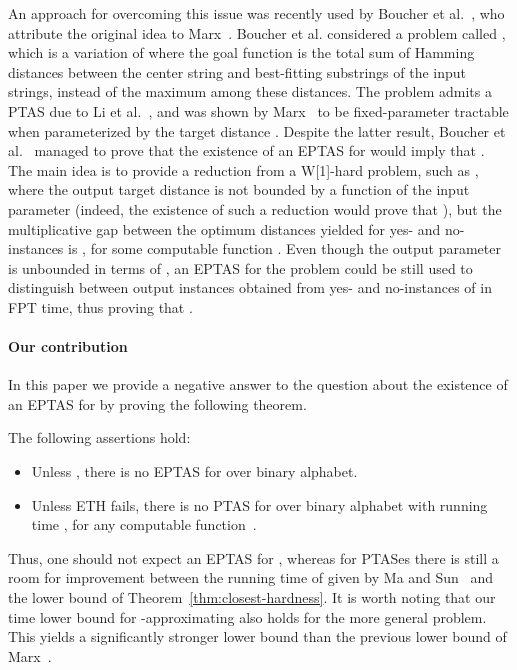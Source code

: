 An approach for overcoming this issue was recently used by Boucher et al.~\cite{Boucher15}, who attribute the original idea to Marx~\cite{Marx08-survey}. Boucher et al. considered a problem called \cPattern, which is a variation of \clSubstring where the goal function is the total sum of Hamming distances between the center string and best-fitting substrings of the input strings, instead of the maximum among these distances. The problem admits a PTAS due to Li et al.~\cite{LiMW02a}, and was shown by Marx~\cite{Marx08} to be fixed-parameter tractable when parameterized by the target distance . Despite the latter result, Boucher et al.~\cite{Boucher15} managed to prove that the existence of an EPTAS for \cPattern would imply that . The main idea is to provide a reduction from a W[1]-hard problem, such as \clique, where the output target distance  is not bounded by a function of the input parameter  (indeed, the existence of such a reduction would prove that ), but the multiplicative gap between the optimum distances yielded for yes- and no-instances is , for some computable function . Even though the output parameter is unbounded in terms of , an EPTAS for the problem could be still used to distinguish between output instances obtained from yes- and no-instances of \clique in FPT time, thus proving that .

\paragraph*{Our contribution} In this paper we provide a negative answer to the question about the existence of an EPTAS for \clString by proving the following theorem.

\begin{theorem}\label{thm:closest-hardness}
The following assertions hold:
\begin{itemize}
\item Unless , there is no EPTAS for \clString over binary alphabet.
\item Unless ETH fails, there is no PTAS for \clString over binary alphabet with running time , for any computable function~.
\end{itemize}
\end{theorem}

Thus, one should not expect an EPTAS for \clString, whereas for PTASes there is still a room for improvement between the running time of  given by Ma and Sun~\cite{MaS09} and the lower bound of Theorem~\ref{thm:closest-hardness}. It is worth noting that our  time lower bound for -approximating \clString also holds for the more general \clSubstring problem. This yields a significantly stronger lower bound than the previous  lower bound of Marx~\cite{Marx08}.

